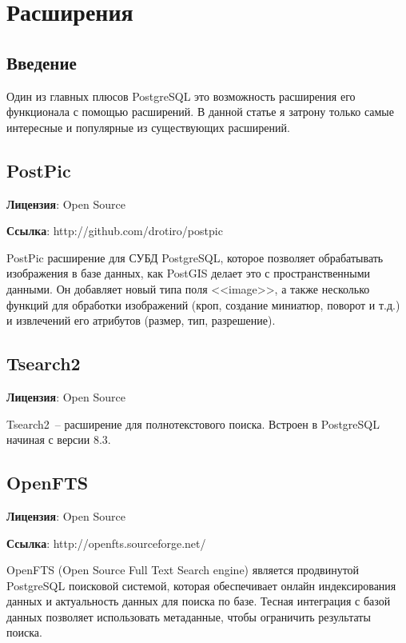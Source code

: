 \chapter{Расширения}
\begin{epigraphs}
\end{epigraphs}

\section{Введение}
Один из главных плюсов PostgreSQL это возможность расширения его функционала с помощью расширений. 
В данной статье я затрону только самые интересные и популярные из существующих расширений. 






\section{PostPic}
\textbf{Лицензия}: Open Source

\textbf{Ссылка}: http://github.com/drotiro/postpic

PostPic расширение для СУБД PostgreSQL, которое позволяет обрабатывать изображения в базе данных, как PostGIS делает это с пространственными данными.
Он добавляет новый типа поля <<image>>, а также несколько функций для обработки изображений (кроп, создание миниатюр, поворот и т.д.) и 
извлечений его атрибутов (размер, тип, разрешение).

\section{Tsearch2}
\textbf{Лицензия}: Open Source

Tsearch2~-- расширение для полнотекстового поиска. Встроен в PostgreSQL начиная с версии 8.3.

\section{OpenFTS}
\textbf{Лицензия}: Open Source

\textbf{Ссылка}: http://openfts.sourceforge.net/

OpenFTS (Open Source Full Text Search engine) является продвинутой PostgreSQL поисковой системой, которая обеспечивает 
онлайн индексирования данных и актуальность данных для поиска по базе. Тесная интеграция с базой данных позволяет использовать метаданные, 
чтобы ограничить результаты поиска.

